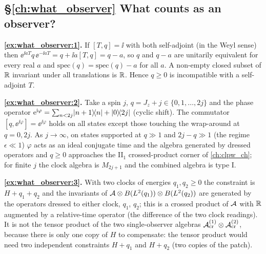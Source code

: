 {\subsection*{\S\ref{ch:what_observer} What counts as an observer?}
\textbf{\ref{ex:what_observer:1}.} If $[T,q]=\ii$ with both self-adjoint (in the Weyl sense) then $\ee^{\ii aT}q\,\ee^{-\ii aT}=q+\ii a[T,q]=q-a$, so $q$ and $q-a$ are unitarily equivalent for every real $a$ and $\mathrm{spec}(q)=\mathrm{spec}(q)-a$ for all $a$. A non-empty closed subset of $\mathbb{R}$ invariant under all translations is $\mathbb{R}$. Hence $q\ge0$ is incompatible with a self-adjoint $T$.\par
\textbf{\ref{ex:what_observer:2}.} Take a spin $j$, $q=J_z+j\in\{0,1,\dots,2j\}$ and the phase operator $\mathrm{e}^{\mathrm{i}\varphi}=\sum_{n<2j}\lvert n+1\rangle\!\langle n\rvert+\lvert 0\rangle\!\langle 2j\rvert$ (cyclic shift). The commutator $[q,\ee^{\ii\varphi}]=\ee^{\ii\varphi}$ holds on all states except those touching the wrap-around at $q=0,2j$. As $j\to\infty$, on states supported at $q\gg1$ and $2j-q\gg1$ (the regime $\epsilon\ll1$) $\varphi$ acts as an ideal conjugate time and the algebra generated by dressed operators and $q\ge0$ approaches the II$_1$ crossed-product corner of \cref{ch:clpw_ch}; for finite $j$ the clock algebra is $M_{2j+1}$ and the combined algebra is type I.\par
\textbf{\ref{ex:what_observer:3}.} With two clocks of energies $q_1,q_2\ge0$ the constraint is $H+q_1+q_2$ and the invariants of $\mathcal{A}\otimes B(L^2(q_1))\otimes B(L^2(q_2))$ are generated by the operators dressed to either clock, $q_1$, $q_2$; this is a crossed product of $\mathcal{A}$ with $\mathbb{R}$ augmented by a relative-time operator (the difference of the two clock readings). It is not the tensor product of the two single-observer algebras $\mathcal{A}_{\rm cr}^{(1)}\otimes\mathcal{A}_{\rm cr}^{(2)}$, because there is only one copy of $H$ to compensate: the tensor product would need two independent constraints $H+q_1$ and $H+q_2$ (two copies of the patch).\par

}

